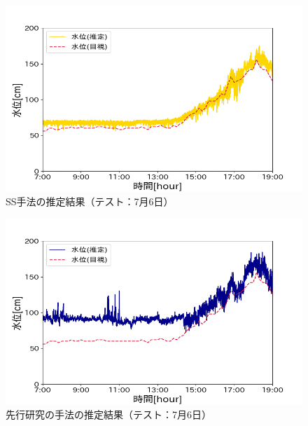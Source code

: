 \begin{figure}[h] 
  \begin{center}
    \includegraphics[width=\linewidth]{image/0706_ss.png}
  \end{center}
  \caption{SS手法の推定結果（テスト：7月6日）}
  \label{ss_0706}
\end{figure}


\begin{figure}[b] 
  \begin{center}
    \includegraphics[width=\linewidth]{image/0706_senkou.png}
  \end{center}
  \caption{先行研究の手法の推定結果（テスト：7月6日）}
  \label{senkou_0706}
\end{figure}

